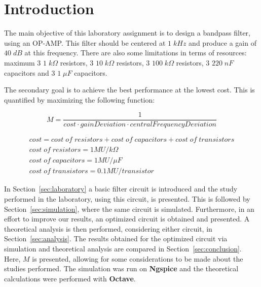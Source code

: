 \newpage

\section{Introduction}
\label{sec:introduction}

The main objective of this laboratory assignment is to design a bandpass filter, using an OP-AMP. This filter should be centered at $1\;kHz$ and produce a gain of $40\;dB$ at this frequency. There are also some limitations in terms of resources: maximum 3 $1\;k\Omega$ resistors, 3 $10\;k\Omega$ resistors, 3 $100\;k\Omega$ resistors, 3 $220\;nF$ capacitors and 3 $1\;\mu F$ capacitors. 

The secondary goal is to achieve the best performance at the lowest cost. This is quantified by maximizing the following function:

\begin{equation}
  M = \frac{1}{cost \cdot gainDeviation \cdot centralFrequencyDeviation}
\end{equation}

\begin{gather*}
  cost = cost\;of\;resistors + cost\;of\;capacitors + cost\;of\;transistors \\
  cost\;of\;resistors = 1 MU/k\Omega \\
  cost\;of\;capacitors = 1 MU/\mu F \\
  cost\;of\;transistors = 0.1 MU/transistor
\end{gather*}

In Section~\ref{sec:laboratory} a basic filter circuit is introduced and the study performed in the laboratory, using this circuit, is presented. This is followed by Section~\ref{sec:simulation}, where the same circuit is simulated. Furthermore, in an effort to improve our results, an optimized circuit is obtained and presented. A theoretical analysis is then performed, considering either circuit, in Section~\ref{sec:analysis}. The results obtained for the optimized circuit via simulation and theoretical analysis are compared in Section~\ref{sec:conclusion}. Here, $M$ is presented, allowing for some considerations to be made about the studies performed. The simulation was run on {\bf Ngspice} and the theoretical calculations were performed with {\bf Octave}.

